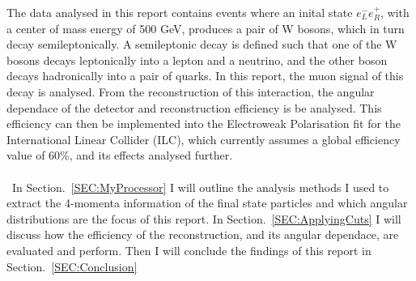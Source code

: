 The data analysed in this report contains events where an inital state ${e}_{L}^{-}{e}_{R}^{+}$, with a center of mass energy of 500 GeV, produces a pair of W bosons, which in turn decay semileptonically. A semileptonic decay is defined such that one of the W bosons decays leptonically into a lepton and a neutrino, and the other boson decays hadronically into a pair of quarks. In this report, the muon signal of this decay is analysed. From the reconstruction of this interaction, the angular dependace of the detector and reconstruction efficiency is be analysed. This efficiency can then be implemented into the Electroweak Polarisation fit for the International Linear Collider (ILC), which currently assumes a global efficiency value of 60\%, and its effects analysed further.
\\\\\
In Section.~\ref{SEC:MyProcessor} I will outline the analysis methods I used to extract the 4-momenta information of the final state particles and which angular distributions are the focus of this report. In Section.~\ref{SEC:ApplyingCuts} I will discuss how the efficiency of the reconstruction, and its angular dependace, are evaluated and perform. Then I will conclude the findings of this report in Section.~\ref{SEC:Conclusion}
